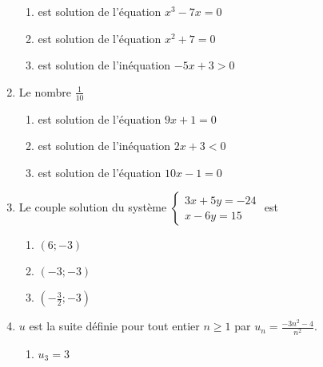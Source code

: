 \documentclass[oneside,twocolumn,landscape]{book}
\begin{document}
\begin{enumerate}
\begin{enumerate}
\item\BonneReponse est solution de l'équation $x^{3}-7x=0$

\item\MauvaiseReponse est solution de l'équation $x^{2}+7=0$


\item\MauvaiseReponse est solution de l'inéquation $-5x+3>0$

\end{enumerate}

\newpage

\item Le nombre $\frac{1}{10}$

\begin{enumerate}

\item\MauvaiseReponse est solution de l'équation $9x+1=0$


\item\MauvaiseReponse est solution de l'inéquation $2x+3<0$

\item\BonneReponse est solution de l'équation $10x-1=0$

\end{enumerate}


\item Le couple solution du système $\left\{\begin{array}{c}3x+5y=-24 \\ x-6y=15\end{array}\right.$ est

\begin{enumerate}

\item\MauvaiseReponse $(6;-3)$

\item\BonneReponse $(-3 ;-3)$

\item\MauvaiseReponse $(-\frac{3}{2} ; -3)$


\end{enumerate}








\item $u$ est la suite définie pour tout entier $n \geqslant 1$ par $u_{n}=\frac{-3n^{2}-4}{n^{2}}$.

\begin{enumerate}

\item\MauvaiseReponse $u_{3}=3$



\end{enumerate}
\end{enumerate}
\end{document}

